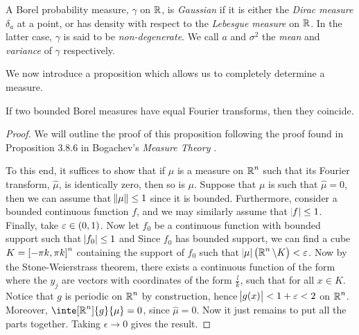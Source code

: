 \documentclass[../main.tex]{subfiles}
\begin{document}
\begin{definition}
\label{def:gauss_1d}
A Borel probability measure, $\gamma$ on $\operatorname{\mathbb{R}}$, is \emph{Gaussian} if it is either the \emph{Dirac measure} $\delta_a$ at a point, or has density  with respect to the \emph{Lebesgue measure} on $\operatorname{\mathbb{R}}$. In the latter case, $\gamma$ is said to be \emph{non-degenerate}. We call $a$ and $\sigma^2$ the \emph{mean} and \emph{variance} of $\gamma$ respectively.
\end{definition}
We now introduce a proposition which allows us to completely determine a measure.
\begin{proposition}
\label{prop:ft_equiv}
If two bounded Borel measures have equal Fourier transforms, then they coincide.
\end{proposition}
\begin{proof}
We will outline the proof of this proposition following the proof found in Proposition 3.8.6 in Bogachev's \textit{Measure Theory} \cite{Bogachev2007}.

To this end, it suffices to show that if $\mu$ is a measure on $\operatorname{\mathbb{R}}^n$ such that its Fourier transform, $\hat{\mu}$, is identically zero, then so is $\mu$. Suppose that $\mu$ is such that $\hat{\mu} = 0$, then we can assume that $\norm{\mu}\leq 1$ since it is bounded. Furthermore, consider a bounded continuous function $f$, and we may similarly assume that $\abs{f}\leq 1$. Finally, take $\epsilon\in\intoo{0,1}$. Now let $f_0$ be a continuous function with bounded support such that $\abs{f_0}\leq 1$ and  Since $f_0$ has bounded support, we can find a cube $K = \intcc{-\pi k,\pi k}^n$ containing the support of $f_0$ such that $\abs{\mu }\del{\R^n\setminus K}<\epsilon$. Now by the Stone-Weierstrass theorem, there exists a continuous function of the form  where the $y_j$ are vectors with coordinates of the form $\frac{l}{k}$, such that  for all $x\in K$. Notice that $g$ is periodic on $\operatorname{\mathbb{R}}^n$ by construction, hence $\abs{g(x)}<1 + \varepsilon<2$ on $\operatorname{\mathbb{R}}^n$. Moreover, $\inte[\R^n]{g}{\mu } = 0$, since $\hat{\mu } = 0$. Now it just remains to put all the parts together.
 Taking $\epsilon\to 0$ gives the result.
\end{proof}
\end{document}
